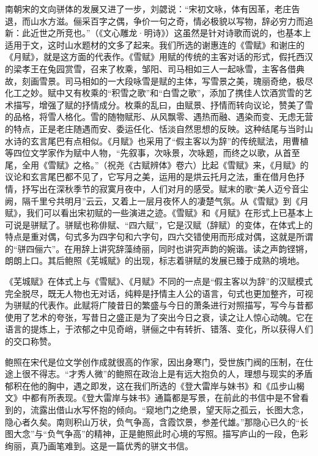 南朝宋的文向骈体的发展又进了一步，刘勰说：“宋初文咏，体有因革，老庄告退，而山水方滋。俪采百字之偶，争价一句之奇，情必极貌以写物，辞必穷力而追新：此近世之所竞也。”（《文心雕龙·明诗》）这虽然是针对诗歌而说的，也基本上适用于文，这时山水题材的文多了起来。我们所选的谢惠连的《雪赋》和谢庄的《月赋》，就是这方面的代表作。《雪赋》用赋的传统的主客对话的形式，假托西汉的梁孝王在兔园赏雪，召来了枚乘，邹阳、司马相如三人一起咏雪，主客各借典故，刻画雪景。司马相如的一大段咏雪是赋的主体，写雪景之美，瑰丽奇绝，极尽化工之妙。赋中又有枚乘的“积雪之歌”和“白雪之歌”，添加了携佳人饮酒赏雪的艺术描写，增强了赋的抒情成分。枚乘的乱曰，由赋景、抒情而转向议论，赞美了雪的品格，将雪人格化。雪的随物赋形、从风飘零、遇热而融、遇染而变、无虑无营的特点，正是老庄随遇而安、委运任化、恬淡自然思想的反映。这种结尾与当时山水诗的玄言尾巴有点相似。《月赋》也采用了“假主客以为辞”的传统赋法，用曹植等四位文学家作为赋中人物，“先叙事，次咏景，次咏题，而终之以歌，从首至尾，全用《雪赋》之格。”（祝尧《古赋辨体》卷六）比起《雪赋》来，《月赋》的议论和玄言尾巴都不见了，它写月之美，运用的是烘云托月之法，重在借月色抒情，抒写出在深秋季节的寂寞月夜中，人们对月的感受。赋末的歌“美人迈兮音尘阙，隔千里兮共明月”云云，又着上一层月夜怀人的凄楚气氛。从《雪赋》到《月赋》，我们可以看出宋初赋的一些演进之迹。《雪赋》和《月赋》在形式上已基本上可说是骈赋了。骈赋也称俳赋、“四六赋”，它是汉赋（辞赋）的变体，在体式上的特点是重对偶，句式多为四字句和六字句，四六交错使用而形成对偶，这就是所谓的“骈四俪六”。在用辞上讲究辞藻绮丽，同时也讲究声韵的婉谐。读之声韵铿锵，朗朗上口。其后鲍照《芜城赋》的出现，标志着骈赋的发展已臻于成熟的境地。

《芜城赋》在体式上与《雪赋》、《月赋》不同的一点是“假主客以为辞”的汉赋模式完全脱尽，既无人物也无对话，纯粹是抒情主人公的语言，句式也更加整齐，可视为骈赋的代表作。此赋将广陵昔日的繁盛与今日的萧条进行对照描写，写今与昔都使用了艺术的夸张，写昔日之盛正是为了突出今日之衰，读之让人惊心动魄。它在语言的提炼上，于浓郁之中见奇峭，骈俪之中有转折、错落、变化，所以获得人们的交口称赞。

鲍照在宋代是位文学创作成就很高的作家，因出身寒门，受世族门阀的压制，在仕途上很不得志。“才秀人微”的鲍照在政治上是有远大抱负的人，理想与现实的矛盾郁积在他的胸中，遇之即发，这在我们所选的《登大雷岸与妹书》和《瓜步山楬文》中都有所表现。《登大雷岸与妹书》通篇都是写景，在前此的书信中是不曾看到的，流露出借山水写怀抱的倾向。“窥地门之绝景，望天际之孤云，长图大念，隐心者久矣。南则积山万状，负气争高，含霞饮景，参差代雄。”那隐心已久的“长图大念”与“负气争高”的精神，正是鲍照此时心境的写照。描写庐山的一段，色彩绚丽，真乃画笔难到。这是一篇优秀的骈文书信。

